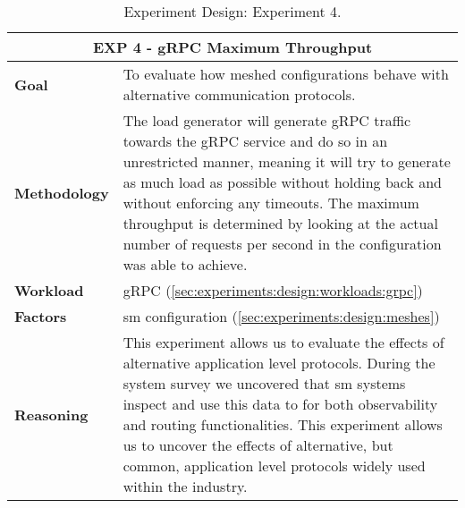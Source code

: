 \begin{table}[!t]
    \centering

    \begin{tabularx}{\textwidth}{l X}
    
        \toprule
        \multicolumn{2}{c}{\textbf{EXP 4 - gRPC Maximum Throughput}}  \\
        \toprule
        
        \textbf{Goal}
        & To evaluate how meshed configurations behave with alternative communication protocols. \\
        \midrule
        
        \textbf{Methodology}
        & The load generator will generate gRPC traffic towards the gRPC service and do so in an unrestricted manner, meaning it will try to generate as much load as possible without holding back and without enforcing any timeouts. The maximum throughput is determined by looking at the actual number of requests per second in the configuration was able to achieve. \\
        \midrule
        
        \textbf{Workload} 
        & gRPC (\cref{sec:experiments:design:workloads:grpc}) \\
        \midrule

        \multirow{1}{*}{\textbf{Factors}} 
        & \Gls{sm} configuration (\cref{sec:experiments:design:meshes}) \\
        \midrule
        
        \textbf{Reasoning}
        & This experiment allows us to evaluate the effects of alternative application level protocols. During the system survey we uncovered that \gls{sm} systems inspect and use this data to for both observability and routing functionalities. This experiment allows us to uncover the effects of alternative, but common, application level protocols widely used within the industry. \\

        \bottomrule

    \end{tabularx}
    \caption[Experiment Design: Experiment 4.]{Experiment Design: Experiment 4.}
    \label{tab:experiment:design:04}
\end{table}
